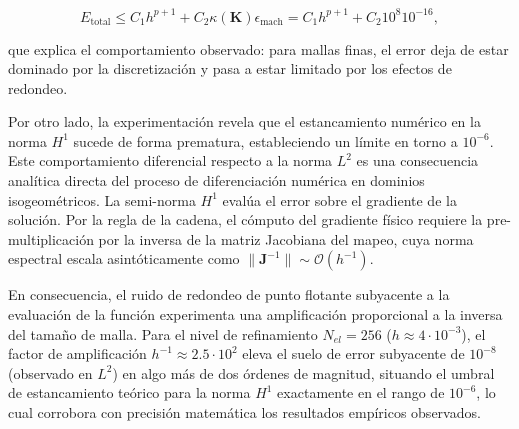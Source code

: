\documentclass[11pt]{book}
\theoremstyle{plain} %
\theoremstyle{definition} %
\theoremstyle{definition} %
\begin{document}
\vspace{-0.5cm}

\begin{equation*}
    E_{\text{total}} \le C_1 h^{p+1} + C_2 \kappa(\mathbf{K}) \epsilon_{\text{mach}}= C_1 h^{p+1} + C_2 10^{8} 10^{-16},
\end{equation*}

\vspace{-0.2cm}
\noindent
que explica el comportamiento observado: para mallas finas, el error deja de estar dominado por la discretización y pasa a estar limitado por los efectos de redondeo.

Por otro lado, la experimentación revela que el estancamiento numérico en la norma $H^1$ sucede de forma prematura, estableciendo un límite en torno a $10^{-6}$. Este comportamiento diferencial respecto a la norma $L^2$ es una consecuencia analítica directa del proceso de diferenciación numérica en dominios isogeométricos. La semi-norma $H^1$ evalúa el error sobre el gradiente de la solución. Por la regla de la cadena, el cómputo del gradiente físico requiere la pre-multiplicación por la inversa de la matriz Jacobiana del mapeo, cuya norma espectral escala asintóticamente como $\|\mathbf{J}^{-1}\| \sim \mathcal{O}(h^{-1})$. 

En consecuencia, el ruido de redondeo de punto flotante subyacente a la evaluación de la función experimenta una amplificación proporcional a la inversa del tamaño de malla. Para el nivel de refinamiento $N_{el} = 256$ ($h \approx 4 \cdot 10^{-3}$), el factor de amplificación $h^{-1} \approx 2.5 \cdot 10^2$ eleva el suelo de error subyacente de $10^{-8}$ (observado en $L^2$) en algo más de dos órdenes de magnitud, situando el umbral de estancamiento teórico para la norma $H^1$ exactamente en el rango de $10^{-6}$, lo cual corrobora con precisión matemática los resultados empíricos observados.
\end{document}
